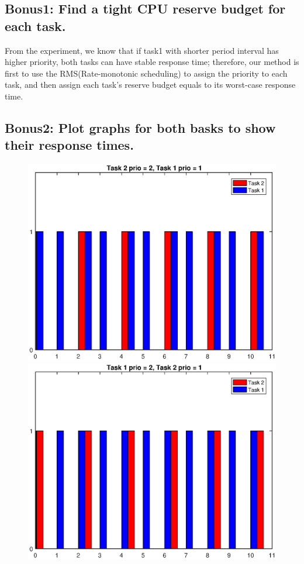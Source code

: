 \documentclass[letterpaper, 12pt]{article}
\begin{document}
\subsection{Bonus1: Find a tight CPU reserve budget for each task.}

From the experiment, we know that if task1 with shorter period interval has higher priority, both tasks can have stable response time; therefore, our method is first to use the RMS(Rate-monotonic scheduling) to assign the priority to each task, and then assign each task's reserve budget equals to its worst-case response time.

\newpage
\subsection{Bonus2: Plot graphs for both basks to show their response times.}

\begin{figure}[!h]
	\centering
	\includegraphics[width=15cm]{./img/Task2_prio2_updated.eps}
	\includegraphics[width=15cm]{./img/Task1_prio2_updated.eps}
\end{figure}
\end{document}

